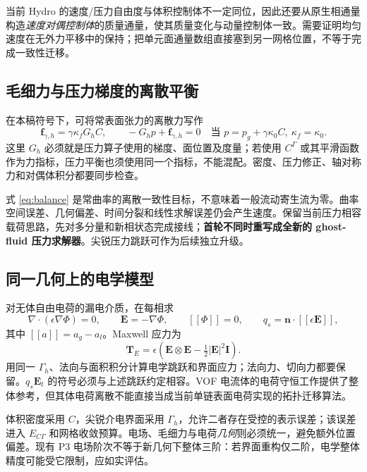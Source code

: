 \documentclass[11pt,a4paper]{article}
\newcommand{\vct}[1]{\boldsymbol{#1}}
\newcommand{\jump}[1]{\left[\!\left[#1\right]\!\right]}
\begin{document}
当前 Hydro 的速度/压力自由度与体积控制体不一定同位，因此还要从原生相通量构造\emph{速度对偶控制体}的质量通量，使其质量变化与动量控制体一致。需要证明均匀速度在无外力平移中的保持；把单元面通量数组直接塞到另一网格位置，不等于完成一致性迁移。

\subsection{毛细力与压力梯度的离散平衡}
在本稿符号下，可将常表面张力的离散力写作
\begin{equation}
 \vct f_{\gamma,h}=\gamma\kappa_f G_hC,
 \qquad -G_hp+\vct f_{\gamma,h}=0
 \quad\text{当 }p=p_g+\gamma\kappa_0C,\ \kappa_f=\kappa_0.\label{eq:balance}
\end{equation}
这里 $G_h$ 必须就是压力算子使用的梯度、面位置及度量；若使用 $C^\Gamma$ 或其平滑函数作为力指标，压力平衡也须使用同一个指标，不能混配。密度、压力修正、轴对称力和对偶体积分都要同步检查。

式 \eqref{eq:balance} 是常曲率的离散一致性目标，不意味着一般流动寄生流为零。曲率空间误差、几何偏差、时间分裂和线性求解误差仍会产生速度。保留当前压力相容载荷思路，先对多分量和新相状态完成接线；\textbf{首轮不同时重写成全新的 ghost-fluid 压力求解器}。尖锐压力跳跃可作为后续独立升级。

\subsection{同一几何上的电学模型}
对无体自由电荷的漏电介质，在每相求
\begin{equation}
 \nabla\cdot(\epsilon\nabla\Phi)=0,\qquad\vct E=-\nabla\Phi,
 \qquad \jump{\Phi}=0,\qquad
 q_s=\vct n\cdot\jump{\epsilon\vct E},
\end{equation}
其中 $\jump{a}=a_g-a_l$。Maxwell 应力为
\begin{equation}
 \vct T_E=\epsilon(\vct E\otimes\vct E-\tfrac12|\vct E|^2\vct I).
\end{equation}
用同一 $\Gamma_h$、法向与面积积分计算电学跳跃和界面应力；法向力、切向力都要保留。$q_s\vct E_t$ 的符号必须与上述跳跃约定相容。VOF 电流体的电荷守恒工作提供了整体参考\cite{lopez2011}，但其体电荷离散不能直接当成当前单链表面电荷实现的拓扑迁移算法。

体积密度采用 $C$，尖锐介电界面采用 $\Gamma_h$，允许二者存在受控的表示误差；该误差进入 $E_{C\Gamma}$ 和网格收敛预算。电场、毛细力与电荷\emph{几何}则必须统一，避免额外位置偏差。现有 P3 电场阶次不等于新几何下整体三阶：若界面重构仅二阶，电学整体精度可能受它限制，应如实评估。
\end{document}
